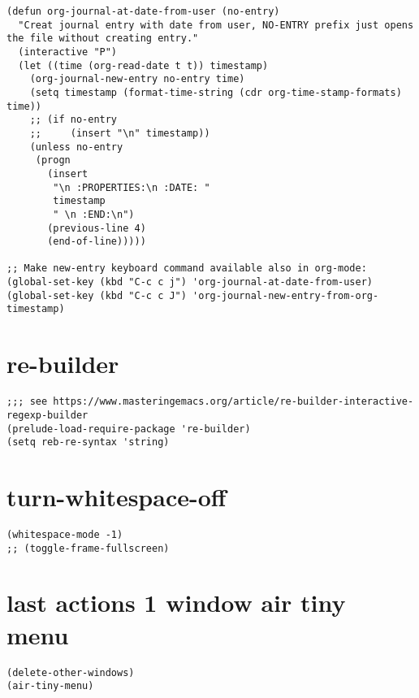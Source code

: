 \documentclass[11pt]{article}
\begin{document}
\begin{verbatim}
(defun org-journal-at-date-from-user (no-entry)
  "Creat journal entry with date from user, NO-ENTRY prefix just opens the file without creating entry."
  (interactive "P")
  (let ((time (org-read-date t t)) timestamp)
    (org-journal-new-entry no-entry time)
    (setq timestamp (format-time-string (cdr org-time-stamp-formats) time))
    ;; (if no-entry
    ;;     (insert "\n" timestamp))
    (unless no-entry
     (progn
       (insert
        "\n :PROPERTIES:\n :DATE: "
        timestamp
        " \n :END:\n")
       (previous-line 4)
       (end-of-line)))))

;; Make new-entry keyboard command available also in org-mode:
(global-set-key (kbd "C-c c j") 'org-journal-at-date-from-user)
(global-set-key (kbd "C-c c J") 'org-journal-new-entry-from-org-timestamp)
\end{verbatim}

\section{re-builder}
\label{sec:org3157454}

\begin{verbatim}
;;; see https://www.masteringemacs.org/article/re-builder-interactive-regexp-builder
(prelude-load-require-package 're-builder)
(setq reb-re-syntax 'string)
\end{verbatim}

\section{turn-whitespace-off}
\label{sec:org77a1020}

\begin{verbatim}
(whitespace-mode -1)
;; (toggle-frame-fullscreen)
\end{verbatim}
\section{last actions 1 window air tiny menu}
\label{sec:org9363876}
\begin{verbatim}
(delete-other-windows)
(air-tiny-menu)
\end{verbatim}
\end{document}
